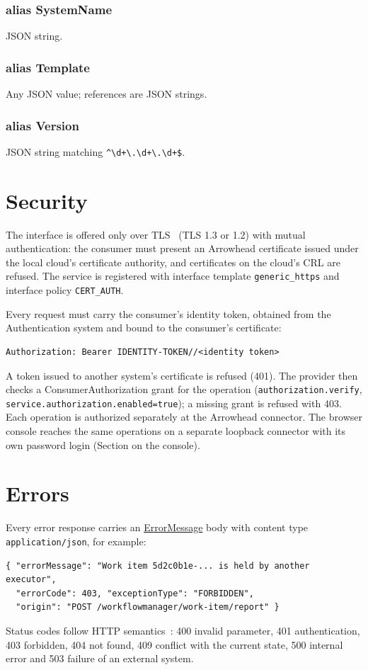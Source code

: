 \documentclass[a4paper]{arrowhead}
\newcommand{\mref}[1]{{\textcolor{ArrowheadPurple}{\hyperref[sec:model:#1]{#1}}}}
\newcommand{\pdef}[1]{{\textcolor{ArrowheadGrey}{#1\label{sec:model:primitives:#1}\label{sec:model:primitives:#1s}}}}
\begin{document}
\subsubsection*{alias \pdef{SystemName}}
JSON string.

\subsubsection*{alias \pdef{Template}}
Any JSON value; references are JSON strings.

\subsubsection*{alias \pdef{Version}}
JSON string matching \texttt{\^{}\textbackslash{}d+\textbackslash{}.\textbackslash{}d+\textbackslash{}.\textbackslash{}d+\$}.



\section{Security}
\label{sec:security}
The interface is offered only over TLS~\cite{rfc8446} (TLS 1.3 or 1.2) with mutual authentication: the consumer must
present an Arrowhead certificate issued under the local cloud's certificate authority, and certificates on the
cloud's CRL are refused. The service is registered with interface template \texttt{generic\_https} and interface
policy \texttt{CERT\_AUTH}.

Every request must carry the consumer's identity token, obtained from the Authentication system and bound to the
consumer's certificate:
\begin{lstlisting}
Authorization: Bearer IDENTITY-TOKEN//<identity token>
\end{lstlisting}
A token issued to another system's certificate is refused (401). The provider then checks a ConsumerAuthorization
grant for the operation (\texttt{authorization.verify}, \texttt{service.authorization.enabled=true}); a missing grant is
refused with 403. Each operation is authorized separately at the Arrowhead connector. The browser console reaches the same operations on a separate loopback connector with its own password login (Section on the console).


\section{Errors}
\label{sec:errors}
Every error response carries an \mref{ErrorMessage} body with content type \texttt{application/json}, for example:
\begin{lstlisting}
{ "errorMessage": "Work item 5d2c0b1e-... is held by another executor",
  "errorCode": 403, "exceptionType": "FORBIDDEN",
  "origin": "POST /workflowmanager/work-item/report" }
\end{lstlisting}
Status codes follow HTTP semantics~\cite{rfc9110}: 400 invalid parameter, 401 authentication, 403 forbidden, 404 not
found, 409 conflict with the current state, 500 internal error and 503 failure of an external system.
\end{document}

